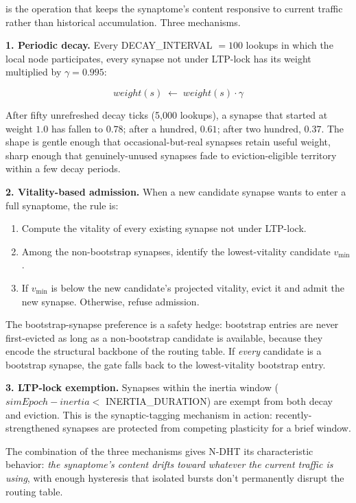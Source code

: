 \documentclass[twoside,nobib]{tufte-book}
\newcommand{\NDHT}{N-DHT\xspace}
\begin{document}
 is the operation that keeps the
synaptome's content responsive to current traffic rather than
historical accumulation. Three mechanisms.

\textbf{1. Periodic decay.} Every \textsc{DECAY\_INTERVAL} $= 100$
lookups in which the local node participates, every synapse not
under LTP-lock has its weight multiplied by $\gamma = 0.995$:

\begin{equation}
  \mathit{weight}(s) \;\leftarrow\; \mathit{weight}(s) \cdot \gamma
\end{equation}

After fifty unrefreshed decay ticks (5{,}000 lookups), a synapse
that started at weight $1.0$ has fallen to $0.78$; after a
hundred, $0.61$; after two hundred, $0.37$. The shape is gentle
enough that occasional-but-real synapses retain useful weight,
sharp enough that genuinely-unused synapses fade to
eviction-eligible territory within a few decay periods.

\textbf{2. Vitality-based admission.} When a new candidate synapse
wants to enter a full synaptome, the rule is:

\begin{enumerate}\setlength\itemsep{0.15em}
  \item Compute the vitality of every existing synapse not under
    LTP-lock.
  \item Among the non-bootstrap synapses, identify the lowest-vitality
    candidate $v_{\min}$.
  \item If $v_{\min}$ is below the new candidate's projected
    vitality, evict it and admit the new synapse. Otherwise,
    refuse admission.
\end{enumerate}

The bootstrap-synapse preference is a safety hedge: bootstrap
entries are never first-evicted as long as a non-bootstrap
candidate is available, because they encode the structural backbone
of the routing table. If \emph{every} candidate is a bootstrap
synapse, the gate falls back to the lowest-vitality bootstrap entry.

\textbf{3. LTP-lock exemption.} Synapses within the inertia
window ($\mathit{simEpoch} - \mathit{inertia} <$ \textsc{INERTIA\_DURATION})
are exempt from both decay and eviction. This is the synaptic-tagging
mechanism in action: recently-strengthened synapses are protected
from competing plasticity for a brief window.

The combination of the three mechanisms gives \NDHT its
characteristic behavior: \emph{the synaptome's content drifts toward
whatever the current traffic is using}, with enough hysteresis that
isolated bursts don't permanently disrupt the routing table.
\end{document}
